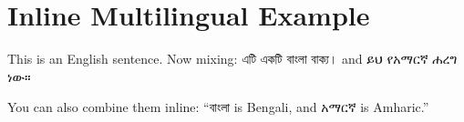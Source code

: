\documentclass{article}
\begin{document}
\section*{Inline Multilingual Example}

This is an English sentence.  
Now mixing:  
\textbengali{এটি একটি বাংলা বাক্য।}  
and \textamharic{ይህ የአማርኛ ሐረግ ነው።}

You can also combine them inline:  
“\textbengali{বাংলা} is Bengali, and \textamharic{አማርኛ} is Amharic.”
\end{document}
